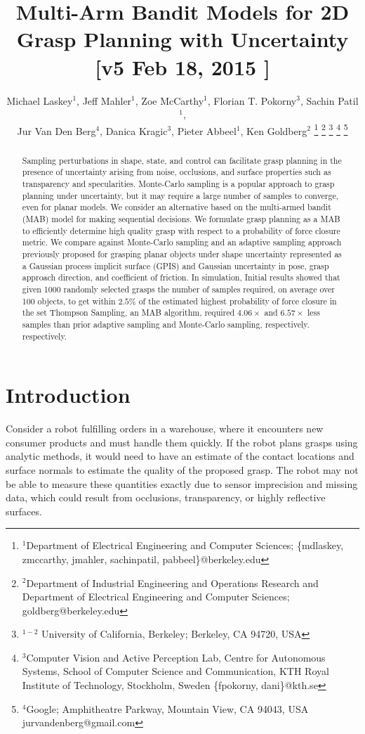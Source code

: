 \documentclass[a4paper, 10pt, conference]{ieeeconf}      %
\title{\LARGE \bf
Multi-Arm Bandit Models for 2D Grasp Planning with Uncertainty  [v5 Feb 18, 2015 ] }
\author{Michael Laskey$^1$, Jeff Mahler$^1$, Zoe McCarthy$^1$,  Florian T. Pokorny$^3$, Sachin Patil$^1$,\\ Jur Van Den Berg$^4$,  Danica Kragic$^3$, Pieter Abbeel$^1$, Ken Goldberg$^2$%
\thanks{$^1$Department of Electrical Engineering and Computer Sciences; {\small \{mdlaskey, zmccarthy, jmahler, sachinpatil, pabbeel\}@berkeley.edu}}%
\thanks{$^2$Department of Industrial Engineering and Operations Research and Department of Electrical Engineering and Computer Sciences; {\small goldberg@berkeley.edu}}%
\thanks{$^{1-2}$ University of California, Berkeley;  Berkeley, CA 94720, USA}%
\thanks{$^3$Computer Vision and Active Perception Lab, Centre for Autonomous Systems, School of Computer Science and Communication, KTH Royal Institute of Technology, Stockholm, Sweden {\small \{fpokorny, dani\}@kth.se}}%
\thanks{$^4$Google; Amphitheatre Parkway, Mountain View, CA 94043, USA {\small jurvandenberg@gmail.com}}%
}
\begin{document}
\maketitle
\thispagestyle{empty}
\pagestyle{empty}



\begin{abstract}
Sampling perturbations in shape, state, and control can facilitate grasp planning in the presence of uncertainty arising from noise, occlusions, and surface properties such as transparency and specularities. 
Monte-Carlo sampling is a popular approach to grasp planning under uncertainty, but it may require a large number of samples to converge, even for planar models.
We consider an alternative based on the multi-armed bandit (MAB) model for making sequential decisions.
We formulate grasp planning as a MAB  to efficiently determine high quality grasp with respect to a probability of force closure metric.
We compare against Monte-Carlo sampling and an adaptive sampling approach previously proposed for grasping planar objects under shape uncertainty represented as a Gaussian process implicit surface (GPIS) and Gaussian uncertainty in pose, grasp approach direction, and coefficient of friction.
In simulation, Initial results  showed that given 1000 randomly selected grasps the number of samples required, on average over 100 objects, to get within $2.5\%$ of the estimated highest probability of force closure in the set Thompson Sampling, an MAB algorithm, required $4.06\times$ and $6.57\times$ less samples than prior adaptive sampling and Monte-Carlo sampling, respectively.  respectively. 
\end{abstract}



\section{Introduction}



Consider a robot fulfilling orders in a warehouse, where it encounters new consumer products and must handle them quickly. If the robot plans grasps using analytic methods, it would need to have an estimate of the contact locations and surface normals to estimate the quality of the proposed grasp. The robot may not be able to measure these quantities exactly due to sensor imprecision and missing data, which could result from occlusions, transparency, or highly reflective surfaces.
\end{document}
